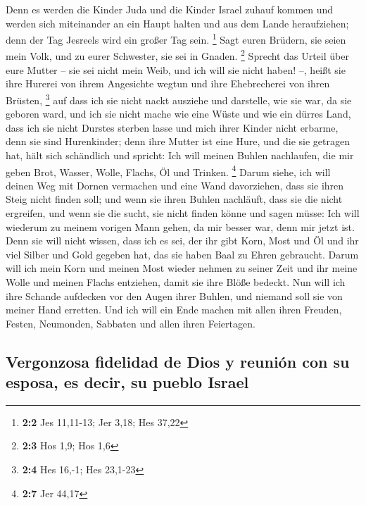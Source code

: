  Denn es werden die Kinder Juda und die Kinder Israel
zuhauf kommen und werden sich miteinander an ein Haupt halten und aus
dem Lande heraufziehen; denn der Tag Jesreels wird ein großer Tag sein.
\footnote{\textbf{2:2} Jes 11,11-13; Jer 3,18; Hes 37,22} 
Sagt euren Brüdern, sie seien mein Volk, und zu eurer Schwester, sie sei
in Gnaden. \footnote{\textbf{2:3} Hos 1,9; Hos 1,6} 
Sprecht das Urteil über eure Mutter -- sie sei nicht mein Weib, und ich
will sie nicht haben! --, heißt sie ihre Hurerei von ihrem Angesichte
wegtun und ihre Ehebrecherei von ihren Brüsten, \footnote{\textbf{2:4}
  Hes 16,-1; Hes 23,1-23}  auf dass ich sie nicht nackt
ausziehe und darstelle, wie sie war, da sie geboren ward, und ich sie
nicht mache wie eine Wüste und wie ein dürres Land, dass ich sie nicht
Durstes sterben lasse  und mich ihrer Kinder nicht
erbarme, denn sie sind Hurenkinder;  denn ihre Mutter ist
eine Hure, und die sie getragen hat, hält sich schändlich und spricht:
Ich will meinen Buhlen nachlaufen, die mir geben Brot, Wasser, Wolle,
Flachs, Öl und Trinken. \footnote{\textbf{2:7} Jer 44,17} 
Darum siehe, ich will deinen Weg mit Dornen vermachen und eine Wand
davorziehen, dass sie ihren Steig nicht finden soll;  und
wenn sie ihren Buhlen nachläuft, dass sie die nicht ergreifen, und wenn
sie die sucht, sie nicht finden könne und sagen müsse: Ich will wiederum
zu meinem vorigen Mann gehen, da mir besser war, denn mir jetzt ist.
 Denn sie will nicht wissen, dass ich es sei, der ihr
gibt Korn, Most und Öl und ihr viel Silber und Gold gegeben hat, das sie
haben Baal zu Ehren gebraucht.  Darum will ich mein Korn
und meinen Most wieder nehmen zu seiner Zeit und ihr meine Wolle und
meinen Flachs entziehen, damit sie ihre Blöße bedeckt. 
Nun will ich ihre Schande aufdecken vor den Augen ihrer Buhlen, und
niemand soll sie von meiner Hand erretten.  Und ich will
ein Ende machen mit allen ihren Freuden, Festen, Neumonden, Sabbaten und
allen ihren Feiertagen.

\hypertarget{vergonzosa-fidelidad-de-dios-y-reuniuxf3n-con-su-esposa-es-decir-su-pueblo-israel}{%
\subsection{Vergonzosa fidelidad de Dios y reunión con su esposa, es
decir, su pueblo
Israel}\label{vergonzosa-fidelidad-de-dios-y-reuniuxf3n-con-su-esposa-es-decir-su-pueblo-israel}}


